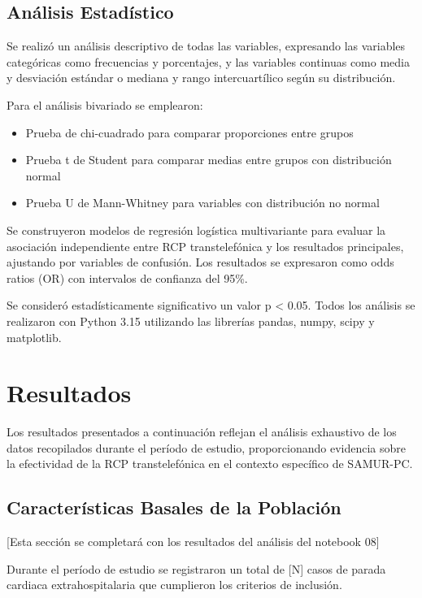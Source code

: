 \documentclass[10pt,a4paper]{article}
\begin{document}
\begin{multicols}{2}
\subsection{Análisis Estadístico}

Se realizó un análisis descriptivo de todas las variables, expresando las variables categóricas como frecuencias y porcentajes, y las variables continuas como media y desviación estándar o mediana y rango intercuartílico según su distribución.

Para el análisis bivariado se emplearon:
\begin{itemize}
\item Prueba de chi-cuadrado para comparar proporciones entre grupos
\item Prueba t de Student para comparar medias entre grupos con distribución normal
\item Prueba U de Mann-Whitney para variables con distribución no normal
\end{itemize}

Se construyeron modelos de regresión logística multivariante para evaluar la asociación independiente entre RCP transtelefónica y los resultados principales, ajustando por variables de confusión. Los resultados se expresaron como odds ratios (OR) con intervalos de confianza del 95\%.

Se consideró estadísticamente significativo un valor p < 0.05. Todos los análisis se realizaron con Python 3.15 utilizando las librerías pandas, numpy, scipy y matplotlib.

\section{Resultados}

Los resultados presentados a continuación reflejan el análisis exhaustivo de los datos recopilados durante el período de estudio, proporcionando evidencia sobre la efectividad de la RCP transtelefónica en el contexto específico de SAMUR-PC.

\subsection{Características Basales de la Población}

[Esta sección se completará con los resultados del análisis del notebook 08]

Durante el período de estudio se registraron un total de [N] casos de parada cardiaca extrahospitalaria que cumplieron los criterios de inclusión.


\end{multicols}
\end{document}
